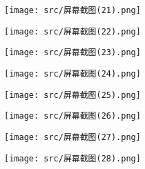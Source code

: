 \documentclass{article}
\begin{document}

\begin{center}
    \texttt{[image: src/屏幕截图(21).png]}
\end{center}



\begin{center}
    \texttt{[image: src/屏幕截图(22).png]}
\end{center}


\begin{center}
    \texttt{[image: src/屏幕截图(23).png]}
\end{center}


\begin{center}
    \texttt{[image: src/屏幕截图(24).png]}
\end{center}


\begin{center}
    \texttt{[image: src/屏幕截图(25).png]}
\end{center}

\begin{center}
    \texttt{[image: src/屏幕截图(26).png]}
\end{center}

\begin{center}
    \texttt{[image: src/屏幕截图(27).png]}
\end{center}

\begin{center}
    \texttt{[image: src/屏幕截图(28).png]}
\end{center}

\newpage
\end{document}
